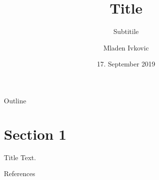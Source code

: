 



\title[shortform]{Title}
\subtitle[shortform-subtitle]{Subtitile}
\author[M. Ivkovic]{Mladen Ivkovic}
\date[17.09.19]{17. September 2019}













\begin{frame}{}
	\titlepage
\end{frame}


\begin{frame}{Outline}\label{tableofcontents}
   \tableofcontents
\end{frame}

\section{Section 1}
\begin{frame}{Title}
    Text.
\end{frame}


\begin{frame}{}
    
\end{frame}


\begin{frame}{}
    
\end{frame}


\begin{frame}{}
    
\end{frame}


\begin{frame}{References}
    \cite{AHF}
    
    \parencite{AMR}
    
    \renewcommand*{\bibfont}{\footnotesize}
    \printbibliography[]    
\end{frame}







